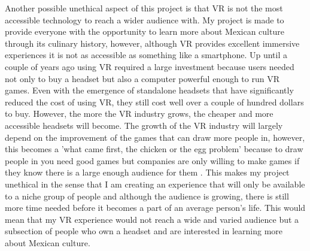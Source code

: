 \documentclass[11pt,twocolumn]{article}
\begin{document}
Another possible unethical aspect of this project is that VR is not the most accessible technology to reach a wider audience with. My project is made to provide everyone with the opportunity to learn more about Mexican culture through its culinary history, however, although VR provides excellent immersive experiences it is not as accessible as something like a smartphone. Up until a couple of years ago using VR required a large investment because users needed not only to buy a headset but also a computer powerful enough to run VR games. Even with the emergence of standalone headsets that have significantly reduced the cost of using VR, they still cost well over a couple of hundred dollars to buy. However, the more the VR industry grows, the cheaper and more accessible headsets will become. The growth of the VR industry will largely depend on the improvement of the games that can draw more people in, however, this becomes a 'what came first, the chicken or the egg problem' because to draw people in you need good games but companies are only willing to make games if they know there is a large enough audience for them \cite{vrbarriers2018}. This makes my project unethical in the sense that I am creating an experience that will only be available to a niche group of people and although the audience is growing, there is still more time needed before it becomes a part of an average person’s life. This would mean that my VR experience would not reach a wide and varied audience but a subsection of people who own a headset and are interested in learning more about Mexican culture. 
\end{document}
